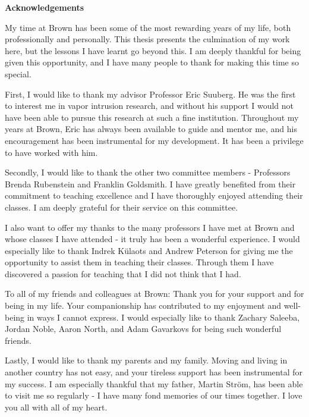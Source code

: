 \begin{center}
\textbf{Acknowledgements}
\end{center}

My time at Brown has been some of the most rewarding years of my life, both professionally and personally.
This thesis presents the culmination of my work here, but the lessons I have learnt go beyond this.
I am deeply thankful for being given this opportunity, and I have many people to thank for making this time so special.\par

First, I would like to thank my advisor Professor Eric Suuberg.
He was the first to interest me in vapor intrusion research, and without his support I would not have been able to pursue this research at such a fine institution.
Throughout my years at Brown, Eric has always been available to guide and mentor me, and his encouragement has been instrumental for my development.
It has been a privilege to have worked with him.\par

Secondly, I would like to thank the other two committee members - Professors Brenda Rubenstein and Franklin Goldsmith.
I have greatly benefited from their commitment to teaching excellence and I have thoroughly enjoyed attending their classes.
I am deeply grateful for their service on this committee.\par

I also want to offer my thanks to the many professors I have met at Brown and whose classes I have attended - it truly has been a wonderful experience.
I would especially like to thank Indrek Külaots and Andrew Peterson for giving me the opportunity to assist them in teaching their classes.
Through them I have discovered a passion for teaching that I did not think that I had.\par

To all of my friends and colleagues at Brown:
Thank you for your support and for being in my life.
Your companionship has contributed to my enjoyment and well-being in ways I cannot express.
I would especially like to thank Zachary Saleeba, Jordan Noble, Aaron North, and Adam Gavarkovs for being such wonderful friends.\par

Lastly, I would like to thank my parents and my family.
Moving and living in another country has not easy, and your tireless support has been instrumental for my success.
I am especially thankful that my father, Martin Ström, has been able to visit me so regularly - I have many fond memories of our times together.
I love you all with all of my heart.\par

\vfill
\newpage
